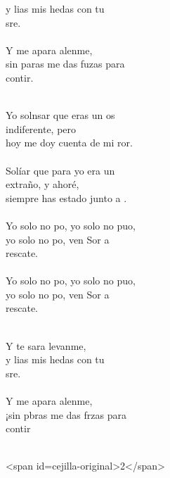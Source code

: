 \begin{cancion}[Y te caes][Hakuna]
\begin{chorus}
	y lias mis hedas con tu\\
	sre.\\
\jump\\
	Y me apara alenme,\\
	sin paras me das fuzas para\\
	contir.\\
	\end{chorus}%
	\jump\\
	Yo solnsar que eras un os\\
	indiferente, pero \\
	hoy me doy cuenta de mi ror.\\
\jump\\
	Solíar que para  yo era un \\
	extraño, y ahoré,\\
	siempre has estado junto a . \\
\jump\\
	Yo solo no po, yo solo no puo,\\
	yo solo no po, ven Sor a \\
	rescate.\\
\jump\\
	Yo solo no po, yo solo no puo,\\
	yo solo no po, ven Sor a \\
	rescate.\\\jump\\
	\begin{chorus}%
	Y te sara levanme,\\
	y lias mis hedas con tu\\
	sre.\\
\jump\\
	Y me apara alenme,\\
	¡sin pbras me das frzas para\\
	contir   \chord{(}{**)}{    }\\
	\end{chorus}%
	\jump\\
<span id=cejilla-original>2</span>\\
\end{cancion}%
